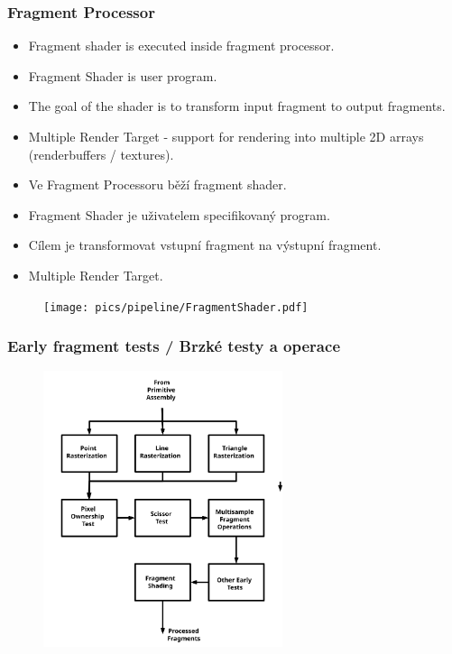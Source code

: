 \begin{frame}
\frametitle{Fragment Processor}
  \scriptsize
	\begin{itemize}
		\item Fragment shader is executed inside fragment processor.
    \item Fragment Shader is user program.
    \item The goal of the shader is to transform input fragment to output fragments.
    \item Multiple Render Target - support for rendering into multiple 2D arrays (renderbuffers / textures).
	\end{itemize}
	\begin{itemize}
		\item Ve Fragment Processoru běží fragment shader.
    \item Fragment Shader je uživatelem specifikovaný program.
    \item Cílem je transformovat vstupní fragment na výstupní fragment.
    \item Multiple Render Target.
	\end{itemize}
	\begin{figure}[h]
		\texttt{[image: pics/pipeline/FragmentShader.pdf]}
	\end{figure}
\end{frame}

\begin{frame}
\frametitle{Early fragment tests / Brzké testy a operace}
	\begin{figure}[h]
	\includegraphics[width=7cm,keepaspectratio]{pics/pipeline/OpenGL460PipelineRaster}
	\end{figure}
\end{frame}

